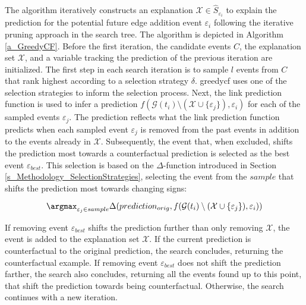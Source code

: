 The algorithm iteratively constructs an explanation $\mathcal{X} \in \hat{S}_{\varepsilon_i}$ to explain the prediction for the potential future edge addition event $\varepsilon_i$ following the iterative pruning approach in the search tree. The algorithm is depicted in Algorithm \ref{a_GreedyCF}. Before the first iteration, the candidate events $C$, the explanation set $\mathcal{X}$, and a variable tracking the prediction of the previous iteration are initialized. The first step in each search iteration is to sample $l$ events from $C$ that rank highest according to a selection strategy $\delta$. \gls{greedycf} uses one of the selection strategies to inform the selection process. Next, the link prediction function is used to infer a prediction $f(\mathcal{G}(t_i) \setminus (\mathcal{X} \cup \{\varepsilon_j\}), \varepsilon_i)$ for each of the sampled events $\varepsilon_j$. The prediction reflects what the link prediction function predicts when each sampled event $\varepsilon_j$ is removed from the past events in addition to the events already in $\mathcal{X}$. Subsequently, the event that, when excluded, shifts the prediction most towards a counterfactual prediction is selected as the best event $\varepsilon_{best}$. This selection is based on the $\Delta$-function introduced in Section \ref{s_Methodology_SelectionStrategies}, selecting the event from the $sample$ that shifts the prediction most towards changing signs:

\begin{equation}
    \argmax_{\varepsilon_j \in sample} \Delta(prediction_{orig}, f(\mathcal{G}(t_i) \setminus (\mathcal{X} \cup \{\varepsilon_j\}), \varepsilon_i))
\end{equation}

If removing event $\varepsilon_{best}$ shifts the prediction further than only removing $\mathcal{X}$, the event is added to the explanation set $\mathcal{X}$. If the current prediction is counterfactual to the original prediction, the search concludes, returning the counterfactual example. If removing event $\varepsilon_{best}$ does not shift the prediction farther, the search also concludes, returning all the events found up to this point, that shift the prediction towards being counterfactual. Otherwise, the search continues with a new iteration.